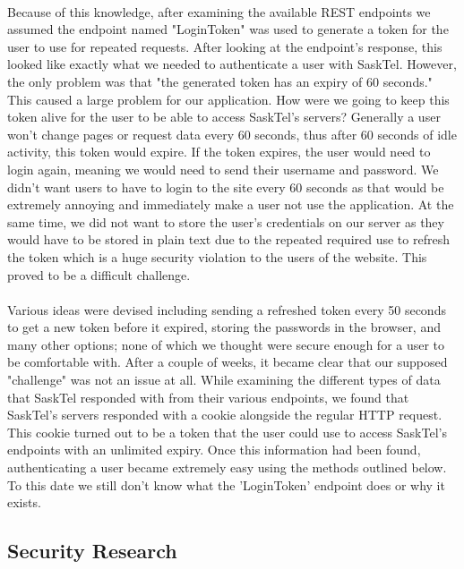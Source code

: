 \documentclass[12pt]{article}
\begin{document}
\paragraph{}
	Because of this knowledge, after examining the available REST endpoints we assumed the endpoint named "LoginToken" was used to generate a token for the user to use for repeated requests. After looking at the endpoint's response, this looked like exactly what we needed to authenticate a user with SaskTel. However, the only problem was that "the generated token has an expiry of 60 seconds." This caused a large problem for our application. How were we going to keep this token alive for the user to be able to access SaskTel's servers? Generally a user won't change pages or request data every 60 seconds, thus after 60 seconds of idle activity, this token would expire. If the token expires, the user would need to login again, meaning we would need to send their username and password. We didn't want users to have to login to the site every 60 seconds as that would be extremely annoying and immediately make a user not use the application. At the same time, we did not want to store the user's credentials on our server as they would have to be stored in plain text due to the repeated required use to refresh the token which is a huge security violation to the users of the website. This proved to be a difficult challenge. 
\paragraph{}
	Various ideas were devised including sending a refreshed token every 50 seconds to get a new token before it expired, storing the passwords in the browser, and many other options; none of which we thought were secure enough for a user to be comfortable with. After a couple of weeks, it became clear that our supposed "challenge" was not an issue at all. While examining the different types of data that SaskTel responded with from their various endpoints, we found that SaskTel's servers responded with a cookie alongside the regular HTTP request. This cookie turned out to be a token that the user could use to access SaskTel's endpoints with an unlimited expiry. Once this information had been found, authenticating a user became extremely easy using the methods outlined below. To this date we still don't know what the 'LoginToken' endpoint does or why it exists.

\subsection{Security Research}
\end{document}
